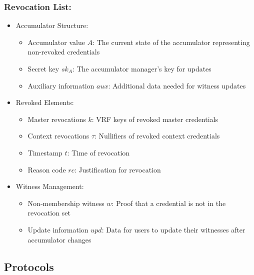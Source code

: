 \subsubsection{Revocation List:} 
\begin{itemize}
    \item Accumulator Structure:
    \begin{itemize}
        \item Accumulator value $A$: The current state of the accumulator representing non-revoked credentials
        \item Secret key $sk_A$: The accumulator manager's key for updates
        \item Auxiliary information $aux$: Additional data needed for witness updates
    \end{itemize}
    \item Revoked Elements:
    \begin{itemize}
        \item Master revocations $k$: VRF keys of revoked master credentials
        \item Context revocations $\tau$: Nullifiers of revoked context credentials
        \item Timestamp $t$: Time of revocation
        \item Reason code $rc$: Justification for revocation
    \end{itemize}
    \item Witness Management:
    \begin{itemize}
        \item Non-membership witness $w$: Proof that a credential is not in the revocation set
        \item Update information $upd$: Data for users to update their witnesses after accumulator changes
    \end{itemize}
\end{itemize}









\newpage
\subsection{Protocols}































